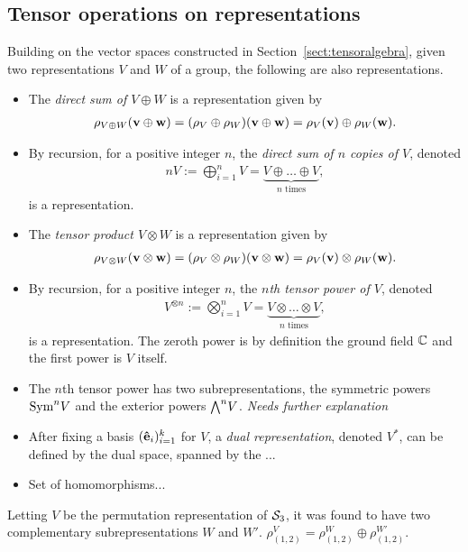 \subsection{Tensor operations on representations}\label{sect:tensorrepr}

Building on the vector spaces constructed in Section~\ref{sect:tensoralgebra}, given two representations $V$ and $W$ of a group, the following are also representations.

\begin{itemize}
	\item The \emph{direct sum of $V \oplus W$} is a representation given by 
	\begin{align*}
		\rho_{V \oplus W}(\mathbf{v} \oplus \mathbf{w}) = (\rho_V \oplus \rho_W)(\mathbf{v} \oplus \mathbf{w}) = \rho_V(\mathbf{v}) \oplus \rho_W(\mathbf{w}).
	\end{align*}
	
	\item By recursion, for a positive integer $n$, the \emph{direct sum of $n$ copies of $V$}, denoted
	\begin{align*}
		nV := \bigoplus_{i=1}^n V = \underset{\text{$n$ times}}{\underbrace{V \oplus \dots \oplus V}},
	\end{align*}
	is a representation.
	
	\item The \emph{tensor product $V \otimes W$} is a representation given by
	\begin{align*}
		\rho_{V \otimes W}(\mathbf{v} \otimes \mathbf{w}) = (\rho_V \otimes \rho_W)(\mathbf{v} \otimes \mathbf{w}) = \rho_V(\mathbf{v}) \otimes \rho_W(\mathbf{w}).
	\end{align*}
	
	\item By recursion, for a positive integer $n$, the \emph{$n$th tensor power of $V$}, denoted
	\begin{align*}
		V^{\otimes n} := \bigotimes_{i=1}^n V = \underset{\text{$n$ times}}{\underbrace{V \otimes \dots \otimes V}},
	\end{align*}
	is a representation. The zeroth power is by definition the ground field $\mathbb{C}$ and the first power is $V$ itself.
	
	\item The $n$th tensor power has two subrepresentations, the symmetric powers $\text{Sym}^n V$ and the exterior powers ${\bigwedge}^n V$. \textit{Needs further explanation}
	
	\item After fixing a basis $(\mathbf{\hat{e}}_i)_{i=1}^k$ for $V$, a \emph{dual representation}, denoted $V^*$, can be defined by the dual space, spanned by the ...
	
	\item Set of homomorphisms...
\end{itemize}


\begin{example}
	Letting $V$ be the permutation representation of $\mathcal{S}_3$, it was found to have two complementary subrepresentations $W$ and $W'$. $\rho_{(1,2)}^V = \rho_{(1,2)}^W \oplus \rho_{(1,2)}^{W'}$.
\end{example}